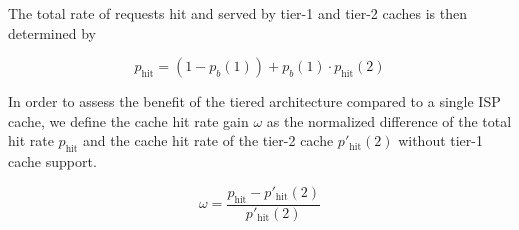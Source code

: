 The total rate of requests hit and served by tier-1 and tier-2 caches is then determined by

\begin{equation}
	p_\text{hit} = (1-p_b(1)) + p_b(1)\cdot p_\text{hit}(2)
\end{equation}

In order to assess the benefit of the tiered architecture compared to a single ISP cache, we define the cache hit rate gain $\omega$ as the normalized difference of the total hit rate $p_\text{hit}$ and the cache hit rate of the tier-2 cache $p'_\text{hit}(2)$ without tier-1 cache support.

\begin{equation}
\omega = \frac{p_\text{hit}-p'_\text{hit}(2)}{p'_\text{hit}(2)}
\end{equation}


